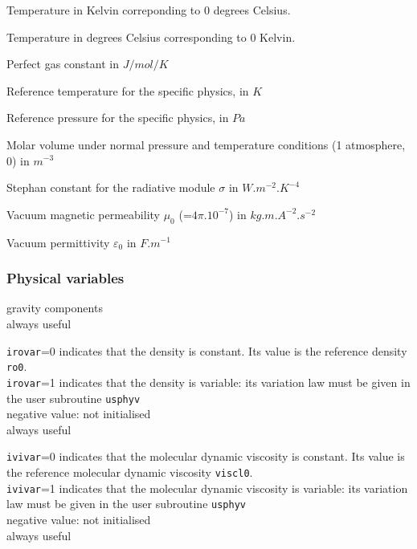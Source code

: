 {Temperature in Kelvin correponding to 0 degrees Celsius.}

{Temperature in degrees Celsius corresponding to 0 Kelvin.}

{Perfect gas constant in $J/mol/K$}

{Reference temperature for the specific physics, in $K$}

{Reference pressure for the specific physics, in $Pa$}

{Molar volume under normal pressure and temperature conditions (1 atmosphere,
0\degresC) in $m^{-3}$}

{Stephan constant for the radiative module $\sigma$ in $W.m^{-2}.K^{-4}$}

{Vacuum magnetic permeability $\mu_0$ (=$4\pi.10^{-7}$) in $kg.m.A^{-2}.s^{-2}$}

{Vacuum permittivity $\varepsilon_0$ in $F.m^{-1}$}


\subsubsection{Physical variables}

{gravity components\\
always useful }

{{\tt irovar}=0 indicates that the density is
constant. Its value is the reference density {\tt ro0}.\\
{\tt irovar}=1 indicates that the density is variable: its variation
law must be given in the user subroutine \texttt{usphyv}\\
negative value: not initialised\\
always useful}

{{\tt ivivar}=0 indicates that the molecular
dynamic viscosity is constant. Its value is the reference molecular
dynamic viscosity {\tt viscl0}.\\
{\tt ivivar}=1 indicates that the molecular dynamic viscosity is
variable: its variation law must be given in the user subroutine
\texttt{usphyv}\\
negative value: not initialised\\
always useful}

